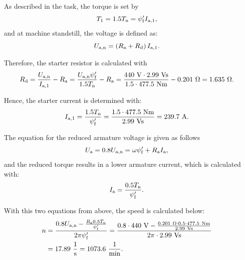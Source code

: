 \begin{solutionblock}
    As described in the task, the torque is set by
    \begin{equation}
        T_{\mathrm{1}} = 1.5 \Tn = \psi_{\mathrm{f}}' I_{\mathrm{a,1}},
    \end{equation}
    and at machine standstill, the voltage is defined as:
    \begin{equation}
        U_{\mathrm{a,n}} = \left(\Ra + R_{\mathrm{d}} \right) I_{\mathrm{a,1}}.
    \end{equation}

    Therefore, the starter resistor is calculated with
    \begin{equation}
        R_{\mathrm{d}} = \frac{U_{\mathrm{a,n}}}{I_{\mathrm{a,1}}} - \Ra
        = \frac{U_{\mathrm{a,n}} \psi_{\mathrm{f}}'}{1.5 \Tn}-\Ra
        = \frac{440 \ \si{V} \cdot 2.99 \ \si{Vs}}{1.5 \cdot 477.5 \ \si{Nm}}-0.201 \ \si{\Omega}
        = 1.635 \ \si{\Omega}.
    \end{equation}

    Hence, the starter current is determined with:
    \begin{equation}
        I_{\mathrm{a,1}} = \frac{1.5 \Tn}{\psi_{\mathrm{f}}'}
        = \frac{1.5 \cdot 477.5 \ \si{Nm}}{2.99 \ \si{Vs}}
        = 239.7 \ \si{A}.
    \end{equation}


\end{solutionblock}



\begin{solutionblock}
    The equation for the reduced armature voltage is given as follows
    \begin{equation}
        U_{\mathrm{a}} = 0.8 U_{\mathrm{a,n}}
        = \omega \psi_{\mathrm{f}}' + \Ra I_{\mathrm{a}},
    \end{equation}
    and the reduced torque results in a lower armature current, which is calculated with:
    \begin{equation}
        I_{\mathrm{a}} = \frac{0.5 \Tn}{\psi_{\mathrm{f}}'}.
    \end{equation}

    With this two equations from above, the speed is calculated below:
    \begin{align}
        \begin{split}
            n &= \frac{0.8 U_{\mathrm{a,n}} - \frac{\Ra 0.5 \Tn}{\psi_{\mathrm{f}}'}}{2 \pi \psi_{\mathrm{f}}'}
            = \frac{0.8 \cdot 440 \ \si{V} - \frac{0.201 \ \si{\Omega} \cdot 0.5 \cdot 477.5 \ \si{Nm}}{2.99 \ \si{Vs}}}{2 \pi \cdot 2.99 \ \si{Vs}}\\
            &= 17.89 \ \si{\frac{1}{s}}
            = 1073.6 \ \si{\frac{1}{min}}.
            \end{split}
    \end{align}


\end{solutionblock}


